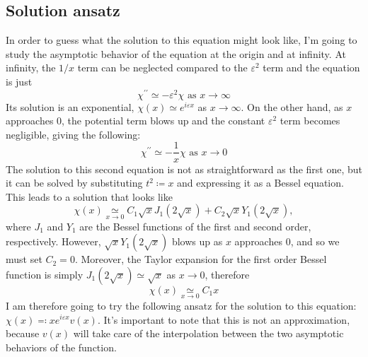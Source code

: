 \subsection{Solution ansatz}
In order to guess what the solution to this equation might look like, I'm going to study the asymptotic behavior of the equation at the origin and at infinity. At infinity, the \(1 / x\) term can be neglected compared to the \(\varepsilon ^2\) term and the equation is just
\begin{equation}
	\chi ^{\prime\prime} \simeq - \varepsilon ^2 \chi \text{ as } x \to \infty 
\end{equation}
Its solution is an exponential, \(\chi (x) \simeq e^{i \varepsilon x}\) as \(x \to \infty \). On the other hand, as \(x\) approaches \(0\), the potential term blows up and the constant \(\varepsilon ^2\) term becomes negligible, giving the following:
\begin{equation}
	\chi ^{\prime\prime} \simeq - \frac{1}{x} \chi \text{ as } x \to 0
\end{equation}
The solution to this second equation is not as straightforward as the first one, but it can be solved by substituting \(t^2\coloneqq x\) and expressing it as a Bessel equation. This leads to a solution that looks like
\begin{equation}
	\chi (x) \underset{x \to 0}{\simeq} C_1 \sqrt{x} J_1 (2 \sqrt{x} ) + C_2 \sqrt{x} Y_1(2 \sqrt{x} ),
\end{equation}
where \(J_1\) and \(Y_1\) are the Bessel functions of the first and second order, respectively. However, \(\sqrt{x} Y_1 (2\sqrt{x} ) \) blows up as \(x\) approaches \(0\), and so we must set \(C_2 = 0\). Moreover, the Taylor expansion for the first order Bessel function is simply \(J_1 (2 \sqrt{x} ) \simeq \sqrt{x} \) as \(x \to 0\), therefore
\begin{equation}
	\chi (x) \underset{x \to 0}{\simeq} C_1x
\end{equation}
I am therefore going to try the following ansatz for the solution to this equation: \(\chi (x) \eqqcolon x e^{i\varepsilon x}v(x)\). It's important to note that this is not an approximation, because \(v(x)\) will take care of the interpolation between the two asymptotic behaviors of the function.

